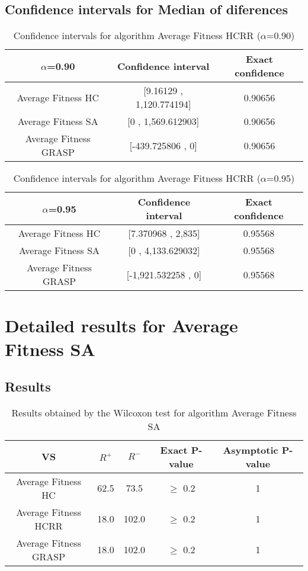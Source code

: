 \documentclass[a4paper,10pt]{article}
\begin{document}
\subsection{Confidence intervals for Median of diferences}

\begin{table}[!htp]
\centering\small
\begin{tabular}{
|c|c|c|}
\hline
 $\alpha$=0.90 & Confidence interval & Exact confidence \\ \hline 
Average Fitness HC       & [9.16129 , 1,120.774194] & 0.90656\\ \hline 
Average Fitness SA      & [0 , 1,569.612903] & 0.90656\\ \hline 
Average Fitness GRASP & [-439.725806 , 0] & 0.90656\\ \hline 

\end{tabular}
\caption{Confidence intervals for algorithm Average Fitness HCRR    ($\alpha$=0.90)}
\end{table}
\begin{table}[!htp]
\centering\small
\begin{tabular}{
|c|c|c|}
\hline
 $\alpha$=0.95 & Confidence interval & Exact confidence \\ \hline 
Average Fitness HC       & [7.370968 , 2,835] & 0.95568\\ \hline 
Average Fitness SA      & [0 , 4,133.629032] & 0.95568\\ \hline 
Average Fitness GRASP & [-1,921.532258 , 0] & 0.95568\\ \hline 

\end{tabular}
\caption{Confidence intervals for algorithm Average Fitness HCRR    ($\alpha$=0.95)}
\end{table}

 \clearpage 


\section{Detailed results for Average Fitness SA     }


\subsection{Results}

\begin{table}[!htp]
\centering\small
\begin{tabular}{
|c|c|c|c|c|}
\hline
 VS & $R^{+}$ & $R^{-}$ & Exact P-value & Asymptotic P-value \\ \hline 
Average Fitness HC       & 62.5 & 73.5 & $\geq$ 0.2 & 1\\ \hline 
Average Fitness HCRR    & 18.0 & 102.0 & $\geq$ 0.2 & 1\\ \hline 
Average Fitness GRASP & 18.0 & 102.0 & $\geq$ 0.2 & 1\\ \hline 

\end{tabular}
\caption{Results obtained by the Wilcoxon test for algorithm Average Fitness SA     }
\end{table}
\end{document}
